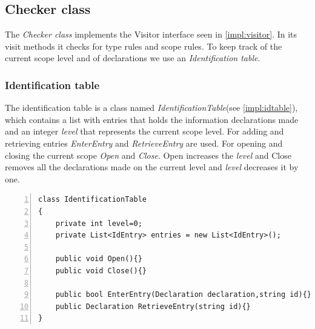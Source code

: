 	\subsection{Checker class}
		The {\it Checker class} implements the Visitor interface seen in \ref{impl:visitor}. 
		In its visit methods it checks for type rules and scope rules. 
		To keep track of the current scope level and of declarations we use an {\it Identification table}.
		
		\subsubsection{Identification table}
			The identification table is a class named {\it IdentificationTable}(see \ref{impl:idtable}), which contains a list with entries 
			that holds the information declarations made and an integer {\it level} that represents the current scope level. 
			For adding and retrieving entries {\it EnterEntry} and {\it RetrieveEntry} are used.
			For opening and closing the current scope {\it Open} and {\it Close}. Open increases the {\it level} and Close removes 
			all the declarations made on the current level and {\it level} decreases it by one.
			\begin{lstlisting}[basicstyle=\small\sffamily,
					keywords={break,case,const,continue,default,else,enum,
					for,if,return,switch,while,do,long,void,int,float,double,
					char,struct,typedef,include,size\_t},
					keywordstyle={\color{blue}},
					comment={[l]{//}}, morecomment={[s]{/*}{*/}}, commentstyle=\itshape,
					columns={[l]flexible}, numbers=left, numberstyle=\tiny,
					frameround=fftt, frame=shadowbox, captionpos=b,
					caption={The IdentificationTable class},
					label=impl:idtable]
class IdentificationTable
{
	private int level=0;
	private List<IdEntry> entries = new List<IdEntry>();
	
	public void Open(){}
	public void Close(){}
	
	public bool EnterEntry(Declaration declaration,string id){}
	public Declaration RetrieveEntry(string id){}
}
			\end{lstlisting}	
		
